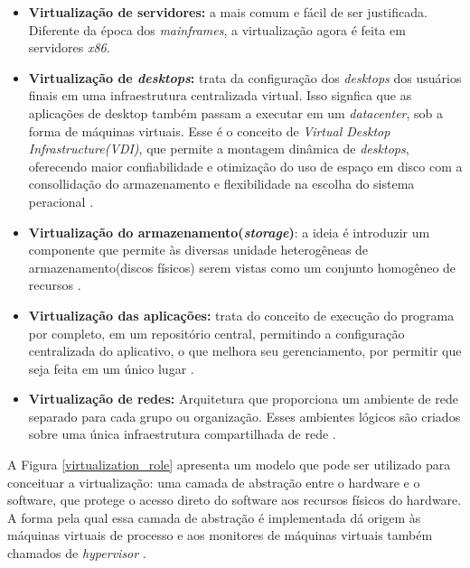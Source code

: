 \begin{itemize}
\item \textbf{Virtualização de servidores:} a mais comum e fácil de ser justificada. Diferente da época dos \textit{mainframes}, a virtualização agora é feita em servidores \textit{x86}.

\item \textbf{Virtualização de \textit{desktops}:} trata da configuração dos \textit{desktops} dos usuários finais em uma infraestrutura centralizada virtual. Isso signfica que as aplicações de desktop também passam a executar em um \textit{datacenter}, sob a forma de máquinas virtuais. Esse é o conceito de \textit{Virtual Desktop Infrastructure(VDI)}, que permite a montagem dinâmica de \textit{desktops}, oferecendo maior confiabilidade e otimização do uso de espaço em disco com a consollidação do armazenamento e flexibilidade na escolha do sistema peracional \cite{manoel}.

\item \textbf{Virtualização do armazenamento(\textit{storage})}: a ideia é introduzir um componente que permite às diversas unidade heterogêneas de armazenamento(discos físicos) serem vistas como um conjunto homogêneo de recursos \cite{manoel}.

\item \textbf{Virtualização das aplicações:} trata do conceito de execução do programa por completo, em um repositório central, permitindo a configuração centralizada do aplicativo, o que melhora seu gerenciamento, por permitir que seja feita em um único lugar \cite{manoel}. 

\item \textbf{Virtualização de redes: } Arquitetura que proporciona um ambiente de rede separado para cada grupo ou organização. Esses ambientes lógicos são criados sobre uma única infraestrutura compartilhada de rede \cite{manoel}.

\end{itemize}

A Figura \ref{virtualization_role} apresenta um modelo que pode ser utilizado para conceituar a virtualização: uma camada de abstração entre o hardware e o software, que protege o acesso direto do software aos recursos físicos do hardware. A forma pela qual essa camada de abstração é implementada dá origem às máquinas virtuais de processo e aos monitores de máquinas virtuais também chamados de \textit{hypervisor} \cite{manoel}.

